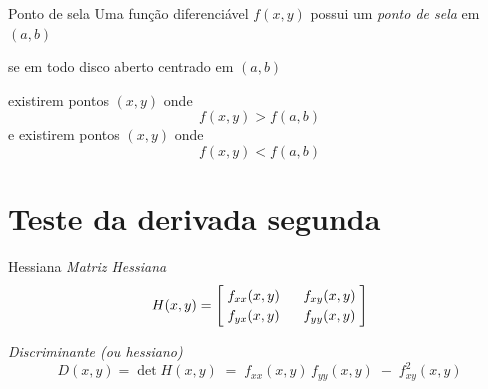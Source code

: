 \documentclass[fleqn,utf8,aspectratio=169,12pt,ignorenonframetext]{beamer}
\begin{document}
\begin{frame}{Ponto de sela}
  Uma função diferenciável \(f(x, y)\) possui um \emph{ponto de sela} em \((a, b)\)

  \pause
  \vspace{0.1\baselineskip}
  se em todo disco aberto centrado em \((a, b)\)

  \pause
  \vspace{0.1\baselineskip}
  existirem pontos \((x, y)\) onde
  \[
    f(x, y) > f(a, b)
  \]
  \pause
  e existirem pontos \((x, y)\) onde
  \[
    f(x, y) < f(a, b)
  \]
\end{frame}



\section{Teste da derivada segunda}

\begin{frame}{Hessiana}
  \emph{Matriz Hessiana}
  \[
    \arraycolsep=2mm
    \def\arraystretch{1.2}
    H(x, y) = \begin{bmatrix}
      \null\;f_{xx}(x, y)\;\null & \null\;f_{xy}(x, y)\;\null \\
      f_{yx}(x, y) & f_{yy}(x, y)
    \end{bmatrix}
  \]

  \pause
  \vspace{\baselineskip}
  \emph{Discriminante (ou hessiano)}
  \[
    D(x, y) = \det H(x, y) \;=\; f_{xx}(x, y)\,f_{yy}(x, y) \;-\; f_{xy}^2(x, y)
  \]
\end{frame}
\end{document}
